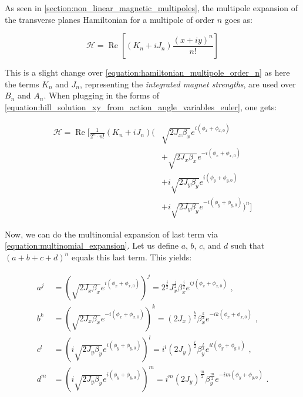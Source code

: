 As seen in \cref{section:non_linear_magnetic_multipoles}, the multipole expansion of the transverse planes Hamiltonian for a multipole of order \(n\) goes as:

\begin{equation}
    \mathcal{H} = \operatorname{Re} \left[ (K_n + i J_n) \frac{(x + i y)^n}{n!} \right]
\end{equation}

This is a slight change over \cref{equation:hamiltonian_multipole_order_n} as here the terms \(K_n\) and \(J_n\), representing the \emph{integrated magnet strengths}, are used over \(B_n\) and \(A_n\).
When plugging in the forms of \cref{equation:hill_solution_xy_from_action_angle_variables_euler}, one gets:

\begin{equation}
    \begin{aligned}
        \mathcal{H} = \operatorname{Re} \biggl[
            \frac{1}{2^n \cdot n!}  (K_n + iJ_n)
            \biggl(
                & \sqrt{2 J_x \beta_x} e^{i \left( \phi_x + \phi_{x,0} \right)}\\
                & + \sqrt{2 J_x \beta_x} e^{-i \left(\phi_x + \phi_{x,0} \right)}\\
                & + i \sqrt{2 J_y \beta_y} e^{i \left(\phi_y+ \phi_{y,0} \right)} \\
                & + i \sqrt{2 J_y \beta_y} e^{-i \left(\phi_y + \phi_{y,0} \right)} 
            \biggr)^n 
            \biggr]
    \end{aligned}
    \label{equation:hamiltonian_multipole_order_n_xy}
\end{equation}

Now, we can do the multinomial expansion of last term via \cref{equation:multinomial_expansion}.
Let us define \(a\), \(b\), \(c\), and \(d\) such that \(\left( a + b + c + d \right)^n\) equals this last term.
This yields:

\begin{equation}
    \begin{aligned}
        a^j &= \left( \sqrt{2 J_x \beta_x} e^{i \left( \phi_x + \phi_{x,0} \right)} \right)^j = 2^{\frac{j}{2}} J_x^{\frac{j}{2}} \beta_x^{\frac{j}{2}} e^{i j \left( \phi_x + \phi_{x,0} \right)} \text{ ,} \\
        b^k &= \left( \sqrt{2 J_x \beta_x} e^{-i \left( \phi_x + \phi_{x,0} \right)} \right)^k = (2 J_x)^{\frac{k}{2}} \beta_x^{\frac{k}{2}} e^{-i k \left( \phi_x + \phi_{x,0} \right)}           \text{ ,} \\
        c^l &= \left( i \sqrt{2 J_y \beta_y} e^{i \left( \phi_y + \phi_{y,0} \right)} \right)^l = i^l  (2 J_y)^{\frac{l}{2}} \beta_y^{\frac{l}{2}} e^{i l \left( \phi_y + \phi_{y,0} \right)}      \text{ ,} \\
        d^m &= \left( i \sqrt{2 J_y \beta_y} e^{i \left( \phi_y + \phi_{y,0} \right)} \right)^m = i^m (2 J_y)^{\frac{m}{2}} \beta_y^{\frac{m}{2}} e^{-i m \left( \phi_y + \phi_{y,0} \right)}      \text{ .} \\
    \end{aligned}
    \label{equation:variables_definition_for_multinomial_expansion}
\end{equation}

